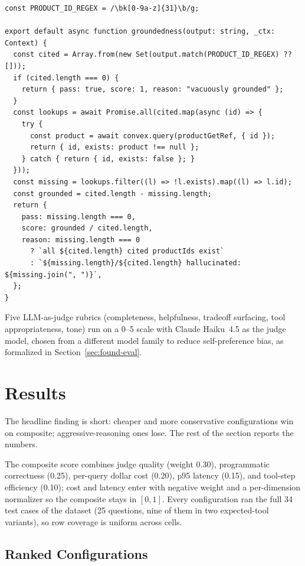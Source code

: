 \begin{listing}[ht]
\begin{verbatim}
const PRODUCT_ID_REGEX = /\bk[0-9a-z]{31}\b/g;

export default async function groundedness(output: string, _ctx: Context) {
  const cited = Array.from(new Set(output.match(PRODUCT_ID_REGEX) ?? []));
  if (cited.length === 0) {
    return { pass: true, score: 1, reason: "vacuously grounded" };
  }
  const lookups = await Promise.all(cited.map(async (id) => {
    try {
      const product = await convex.query(productGetRef, { id });
      return { id, exists: product !== null };
    } catch { return { id, exists: false }; }
  }));
  const missing = lookups.filter((l) => !l.exists).map((l) => l.id);
  const grounded = cited.length - missing.length;
  return {
    pass: missing.length === 0,
    score: grounded / cited.length,
    reason: missing.length === 0
      ? `all ${cited.length} cited productIds exist`
      : `${missing.length}/${cited.length} hallucinated: ${missing.join(", ")}`,
  };
}
\end{verbatim}
  \caption{The \texttt{groundedness} scorer.}
  \label{lst:groundedness}
\end{listing}

Five LLM-as-judge rubrics (completeness, helpfulness, tradeoff
surfacing, tool appropriateness, tone) run on a 0--5 scale with
Claude Haiku~4.5 as the judge model, chosen from a different
model family to reduce self-preference bias, as formalized in
Section~\ref{sec:found-eval}.

\section{Results}
\label{sec:sys-results}

The headline finding is short: cheaper and more conservative
configurations win on composite; aggressive-reasoning ones lose.
The rest of the section reports the numbers.

The composite score combines judge quality (weight 0.30),
programmatic correctness (0.25), per-query dollar cost (0.20),
p95 latency (0.15), and tool-step efficiency (0.10); cost and
latency enter with negative weight and a per-dimension normalizer
so the composite stays in $[0,1]$. Every configuration ran the
full 34 test cases of the dataset (25 questions, nine of them in
two expected-tool variants), so row coverage is uniform across
cells.

\subsection{Ranked Configurations}
\label{subsec:results-sweep}

